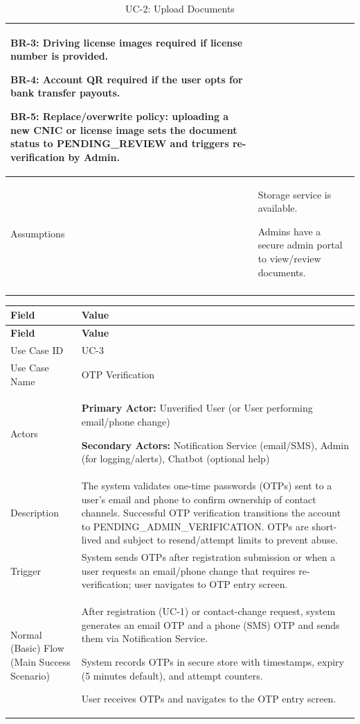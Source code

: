 \begin{longtable}{|p{3.5cm}|p{12cm}|}
\textbf{BR-3:} Driving license images required if license number is provided.

\textbf{BR-4:} Account QR required if the user opts for bank transfer payouts.

\textbf{BR-5:} Replace/overwrite policy: uploading a new CNIC or license image sets the document status to PENDING\_REVIEW and triggers re-verification by Admin. \\
\hline
Assumptions & 
Storage service is available.

Admins have a secure admin portal to view/review documents. \\
\hline
\caption{UC-2: Upload Documents}
\end{longtable}

\begin{longtable}{|p{3.5cm}|p{12cm}|}
\hline
\rowcolor{lightgray!30}
\textbf{Field} & \textbf{Value} \\
\hline
\endfirsthead
\hline
\rowcolor{lightgray!30}
\textbf{Field} & \textbf{Value} \\
\hline
\endhead
\hline
\endfoot
Use Case ID & UC-3 \\
\hline
Use Case Name & OTP Verification \\
\hline
Actors &
\textbf{Primary Actor:} Unverified User (or User performing email/phone change)

\textbf{Secondary Actors:} Notification Service (email/SMS), Admin (for logging/alerts), Chatbot (optional help) \\
\hline
Description &
The system validates one-time passwords (OTPs) sent to a user's email and phone to confirm ownership of contact channels. Successful OTP verification transitions the account to PENDING\_ADMIN\_VERIFICATION. OTPs are short-lived and subject to resend/attempt limits to prevent abuse. \\
\hline
Trigger &
System sends OTPs after registration submission or when a user requests an email/phone change that requires re-verification; user navigates to OTP entry screen. \\
\hline
Normal (Basic) Flow (Main Success Scenario) &
After registration (UC-1) or contact-change request, system generates an email OTP and a phone (SMS) OTP and sends them via Notification Service.

System records OTPs in secure store with timestamps, expiry (5 minutes default), and attempt counters.

User receives OTPs and navigates to the OTP entry screen.


\end{longtable}
